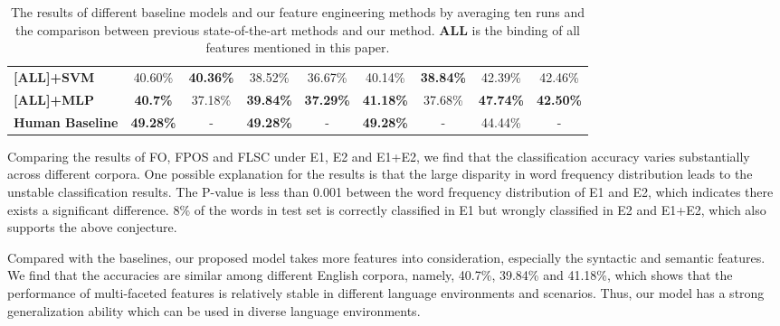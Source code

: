 \begin{table}[th]
\begin{center}
\begin{tabular}{lcccccccc}
			\textbf{{[}ALL{]}+SVM}     & 40.60\%& \textbf{40.36\%} & 38.52\%&  36.67\% &40.14\%&  \textbf{38.84\%}  &      42.39\% &   42.46\%\\ 
			\textbf{{[}ALL{]}+MLP}     & \textbf{40.7\%}&  37.18\%&\textbf{39.84\%} & \textbf{37.29\%}     &\textbf{41.18\%}&    37.68\%  &\textbf{47.74\%}&\textbf{42.50\%}\\ \hline
			\hline
			\textbf{Human Baseline}    &\textbf{49.28\%}&  -& \textbf{49.28\%}&-  &\textbf{49.28\%}&- &44.44\%&  -\\ \hline
		\end{tabular}
	\end{center}
	\vspace{-0.45cm}
	\caption{\label{tab:results} The results of different baseline models and our feature engineering methods by averaging ten runs and the comparison between previous state-of-the-art methods and our method. \textbf{ALL} is the binding of all features mentioned in this paper.}
\end{table}

Comparing the results of FO, FPOS and FLSC under E1, E2 and E1+E2, 
we find that the classification accuracy varies substantially
across different corpora.
One possible explanation for the results is that the large disparity in word frequency distribution leads to the unstable classification results. 
The P-value is less than 0.001 between the  word frequency distribution of 
E1 and E2, which indicates there exists a significant difference.
8\% of the words in test set is correctly classified in E1 but wrongly classified in E2 and E1+E2, which also supports the above conjecture.
	
	
Compared with the baselines, our proposed model takes more features 
into consideration, especially the syntactic and semantic features.
We find that the accuracies are similar among different English corpora,
namely, 40.7\%, 39.84\% and 41.18\%, 
which shows that the performance of  multi-faceted features 
is relatively stable in different language environments and scenarios.
Thus, our model has a strong generalization ability which can 
be used in diverse language environments.
	
